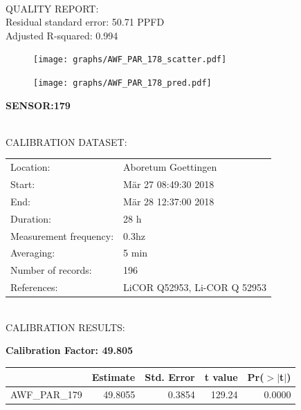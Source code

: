 \documentclass[oneside]{report}
\begin{document}
\hrulefill\\
QUALITY REPORT:\\
Residual standard error: 50.71 PPFD\\
Adjusted R-squared: 0.994



\begin{figure}[H]
  \centering
  \texttt{[image: graphs/AWF\_PAR\_178\_scatter.pdf]}
\end{figure}




\begin{figure}[H]
  \centering
  \texttt{[image: graphs/AWF\_PAR\_178\_pred.pdf]}
\end{figure}

\pagebreak


\begin{center}
\large{\textbf{SENSOR:179}}\\
\end{center}

\hrulefill\\
CALIBRATION DATASET:\\
\begin{table}[h!]
  \centering
  \label{tab:table1}
  \begin{tabular}{ll}
    Location: & Aboretum Goettingen\\ 
    
    
    Start:  & Mär 27 08:49:30 2018 \\
    End:   & Mär 28 12:37:00 2018\\ 
    Duration: & 28 h\\
    Measurement frequency: & 0.3hz\\
    Averaging:  &5 min\\
    Number of records: & 196 \\
    References: & LiCOR Q52953, Li-COR Q 52953 \\
  \end{tabular}
\end{table}

\hrulefill\\
CALIBRATION RESULTS:\\


\begin{center}
\textbf{\large{Calibration Factor: 49.805}}\\
\end{center}
\begin{table}[ht]
\centering
\begin{tabular}{rrrrr}
  \hline
 & Estimate & Std. Error & t value & Pr($>$$|$t$|$) \\ 
  \hline
AWF\_PAR\_179 & 49.8055 & 0.3854 & 129.24 & 0.0000 \\ 
   \hline
\end{tabular}
\end{table}
\end{document}
